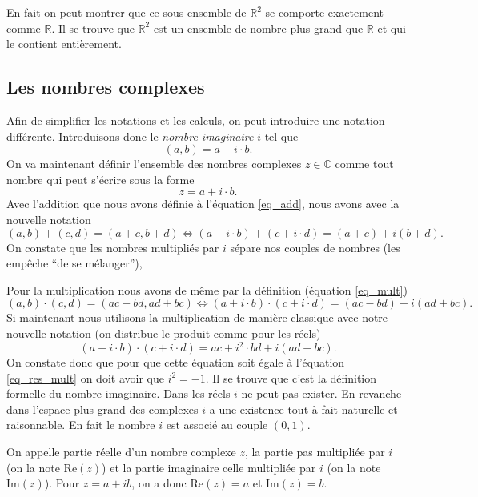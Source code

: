 \documentclass[a4paper,12pt]{book}
\newcommand{\real}{\mathbb{R}}
\newcommand{\complex}{\mathbb{C}}
\renewcommand{\Re}{\mathrm{Re}}
\renewcommand{\Im}{\mathrm{Im}}
\begin{document}
En fait on peut montrer que ce sous-ensemble de $\real^2$ se comporte exactement comme $\real$. Il se trouve que $\real^2$ est
un ensemble de nombre plus grand que $\real$ et qui le contient entièrement.

\subsection{Les nombres complexes}

Afin de simplifier les notations et les calculs, on peut introduire une notation différente.
Introduisons donc le \textit{nombre imaginaire} $i$ tel que
\begin{equation}
 (a,b)=a+i\cdot b.
\end{equation}
On va maintenant définir l'ensemble des nombres complexes $z\in\complex$ comme tout nombre qui peut s'écrire sous 
la forme 
\begin{equation}
 z=a+i\cdot b.
\end{equation}
Avec l'addition que nous avons définie 
à l'équation \eqref{eq_add}, nous avons avec la nouvelle notation
\begin{equation}
 (a,b)+(c,d)=(a+c,b+d)\Leftrightarrow(a+i\cdot b)+(c+i\cdot d)=(a+c)+i(b+d).
\end{equation}
On constate que les nombres multipliés par $i$ sépare nos couples de nombres (les empêche ``de se mélanger''),

Pour la multiplication nous avons de même par la définition (équation \eqref{eq_mult})
\begin{equation}
 (a,b)\cdot(c,d)=(ac-bd,ad+bc)\Leftrightarrow(a+i\cdot b)\cdot(c+i\cdot d)=(ac-bd)+i(ad+bc).\label{eq_res_mult}
\end{equation}
Si maintenant nous utilisons la multiplication de manière classique avec notre nouvelle notation (on distribue le produit 
comme pour les réels)
\begin{equation}
 (a+i\cdot b)\cdot(c+i\cdot d)=ac+i^2\cdot bd+i(ad+bc).
\end{equation}
On constate donc que pour que cette équation soit égale à l'équation \eqref{eq_res_mult}
on doit avoir que $i^2=-1$. Il se trouve que c'est la définition formelle du nombre imaginaire.
Dans les réels $i$ ne peut pas exister. En revanche dans l'espace plus grand des complexes $i$
a une existence tout à fait naturelle et raisonnable. En fait le nombre $i$ est associé au couple $(0,1)$.

On appelle partie réelle d'un nombre complexe $z$, la partie pas multipliée par $i$ (on la note $\Re(z)$) et la partie imaginaire
celle multipliée par $i$ (on la note $\Im(z)$). Pour $z=a+ib$, on a donc $\Re(z)=a$ et $\Im(z)=b$.
\end{document}
